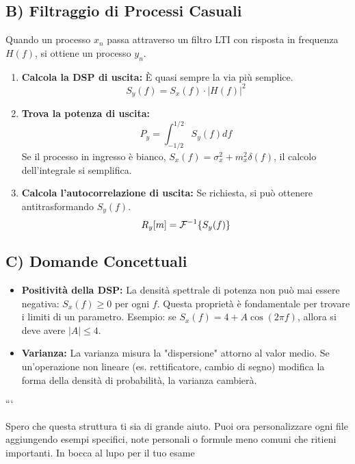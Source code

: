 \subsection{B) Filtraggio di Processi Casuali}
Quando un processo $x_n$ passa attraverso un filtro LTI con risposta in frequenza $H(f)$, si ottiene un processo $y_n$.
\begin{enumerate}
    \item \textbf{Calcola la DSP di uscita:} È quasi sempre la via più semplice.
    $$ S_y(f) = S_x(f) \cdot |H(f)|^2 $$
    \item \textbf{Trova la potenza di uscita:}
    $$ P_y = \int_{-1/2}^{1/2} S_y(f) df $$
    Se il processo in ingresso è bianco, $S_x(f) = \sigma_x^2 + m_x^2\delta(f)$, il calcolo dell'integrale si semplifica.
    \item \textbf{Calcola l'autocorrelazione di uscita:} Se richiesta, si può ottenere antitrasformando $S_y(f)$.
    $$ R_y[m] = \mathcal{F}^{-1}\{S_y(f)\} $$
\end{enumerate}

\subsection{C) Domande Concettuali}
\begin{itemize}
    \item \textbf{Positività della DSP:} La densità spettrale di potenza non può mai essere negativa: $S_x(f) \ge 0$ per ogni $f$. Questa proprietà è fondamentale per trovare i limiti di un parametro. Esempio: se $S_x(f) = 4 + A\cos(2\pi f)$, allora si deve avere $|A| \le 4$.
    \item \textbf{Varianza:} La varianza misura la "dispersione" attorno al valor medio. Se un'operazione non lineare (es. rettificatore, cambio di segno) modifica la forma della densità di probabilità, la varianza cambierà.
\end{itemize}```

Spero che questa struttura ti sia di grande aiuto. Puoi ora personalizzare ogni file aggiungendo esempi specifici, note personali o formule meno comuni che ritieni importanti. In bocca al lupo per il tuo esame